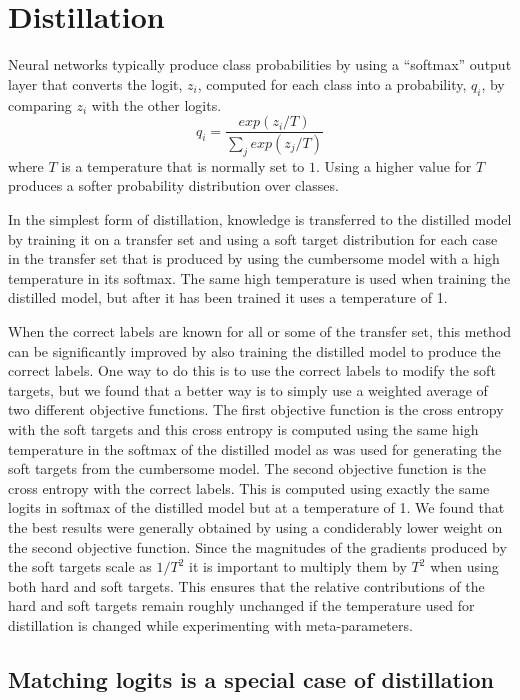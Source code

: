 \section{Distillation}\label{sec:distillation}

Neural networks typically produce class probabilities by using a ``softmax'' output layer that converts the logit,
$z_i$, computed for each class into a probability, $q_i$, by comparing $z_i$ with the other logits.
\begin{equation}
q_i = \frac{exp(z_i/T)}{\sum_j exp(z_j/T)}
\end{equation}
where $T$ is a temperature that is normally set to $1$.  Using a higher value for $T$ produces a softer probability
distribution over classes.

In the simplest form of distillation, knowledge is transferred to the distilled model by training it on a transfer set
and using a soft target distribution for each case in the transfer set that is produced by using the cumbersome model
with a high temperature in its softmax.  The same high temperature is used when training the distilled model, but after
it has been trained it uses a temperature of 1.

When the correct labels are known for all or some of the transfer set,
this method can be significantly improved by also training the
distilled model to produce the correct labels. One way to do this is
to use the correct labels to modify the soft targets, but we found
that a better way is to simply use a weighted average of two different
objective functions.  The first objective function is the cross
entropy with the soft targets and this cross entropy is computed using
the same high temperature in the softmax of the distilled model as was
used for generating the soft targets from the cumbersome model. The
second objective function is the cross entropy with the correct
labels. This is computed using exactly the same logits in softmax of
the distilled model but at a temperature of 1.  We found that the best
results were generally obtained by using a condiderably lower weight
on the second objective function. Since the magnitudes of the
gradients produced by the soft targets scale as $1/T^2$ it is
important to multiply them by $T^2$ when using both hard and soft
targets. This ensures that the relative contributions of the hard and
soft targets remain roughly unchanged if the temperature used for
distillation is changed while experimenting with meta-parameters.

\subsection{Matching logits is a special case of distillation}

